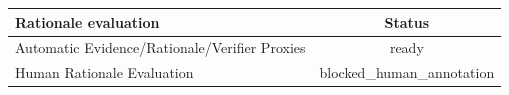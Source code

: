 \begin{tabular}{lc}
\toprule
Rationale evaluation & Status \\ 
\midrule
Automatic Evidence/Rationale/Verifier Proxies & ready \\
Human Rationale Evaluation & blocked\_human\_annotation \\
\bottomrule
\end{tabular}
